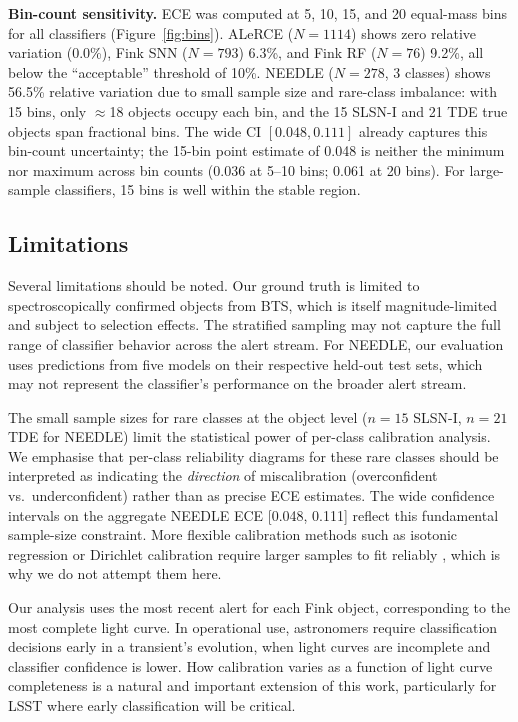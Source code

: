 \documentclass[twocolumn]{aastex631}
\begin{document}
\textbf{Bin-count sensitivity.} ECE was computed at 5, 10, 15, and 20 equal-mass bins for all classifiers (Figure~\ref{fig:bins}). ALeRCE ($N = 1114$) shows zero relative variation (0.0\%), Fink SNN ($N = 793$) 6.3\%, and Fink RF ($N = 76$) 9.2\%, all below the ``acceptable'' threshold of 10\%. NEEDLE ($N = 278$, 3 classes) shows 56.5\% relative variation due to small sample size and rare-class imbalance: with 15 bins, only $\approx$18 objects occupy each bin, and the 15 SLSN-I and 21 TDE true objects span fractional bins. The wide CI $[0.048, 0.111]$ already captures this bin-count uncertainty; the 15-bin point estimate of 0.048 is neither the minimum nor maximum across bin counts (0.036 at 5--10 bins; 0.061 at 20 bins). For large-sample classifiers, 15 bins is well within the stable region.

\subsection{Limitations}

Several limitations should be noted. Our ground truth is limited to spectroscopically confirmed objects from BTS, which is itself magnitude-limited and subject to selection effects. The stratified sampling may not capture the full range of classifier behavior across the alert stream. For NEEDLE, our evaluation uses predictions from five models on their respective held-out test sets, which may not represent the classifier's performance on the broader alert stream.

The small sample sizes for rare classes at the object level ($n = 15$ SLSN-I, $n = 21$ TDE for NEEDLE) limit the statistical power of per-class calibration analysis. We emphasise that per-class reliability diagrams for these rare classes should be interpreted as indicating the \emph{direction} of miscalibration (overconfident vs.\ underconfident) rather than as precise ECE estimates. The wide confidence intervals on the aggregate NEEDLE ECE [0.048, 0.111] reflect this fundamental sample-size constraint. More flexible calibration methods such as isotonic regression or Dirichlet calibration require larger samples to fit reliably \citep{vaicenavicius2019}, which is why we do not attempt them here.

Our analysis uses the most recent alert for each Fink object, corresponding to the most complete light curve. In operational use, astronomers require classification decisions early in a transient's evolution, when light curves are incomplete and classifier confidence is lower. How calibration varies as a function of light curve completeness is a natural and important extension of this work, particularly for LSST where early classification will be critical.
\end{document}
